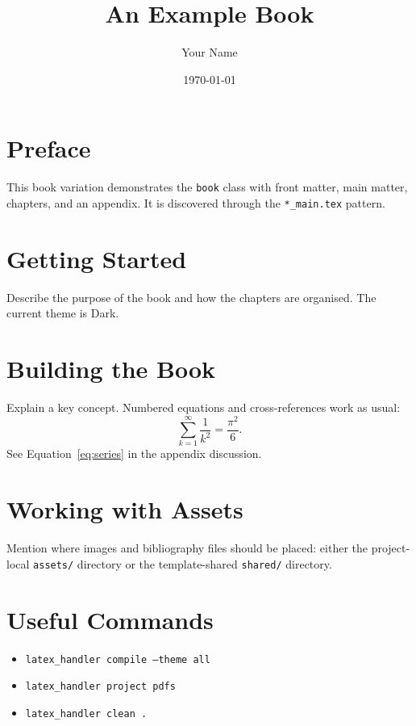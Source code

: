 \documentclass[11pt,a4paper]{book}
\title{An Example Book}
\author{Your Name}
\date{\today}
\def\lhthemevalue{Light}
\def\lhthemevalue{Dark}
\providecommand{\lhbar}{}
\providecommand{\lhfootertext}{}
\begin{document}
\frontmatter
\maketitle
\lhbar

\chapter*{Preface}
This book variation demonstrates the \texttt{book} class with front matter,
main matter, chapters, and an appendix. It is discovered through the
\texttt{*\_main.tex} pattern.

\tableofcontents

\mainmatter

\chapter{Getting Started}
Describe the purpose of the book and how the chapters are organised. The
current theme is \lhthemevalue.

\chapter{Building the Book}
Explain a key concept. Numbered equations and cross-references work as usual:
\begin{equation}
  \label{eq:series}
  \sum_{k=1}^{\infty} \frac{1}{k^2} = \frac{\pi^2}{6}.
\end{equation}
See Equation~\ref{eq:series} in the appendix discussion.

\chapter{Working with Assets}
Mention where images and bibliography files should be placed: either the
project-local \texttt{assets/} directory or the template-shared \texttt{shared/}
directory.

\appendix

\chapter{Useful Commands}
\begin{itemize}
  \item \texttt{latex\_handler compile --theme all}
  \item \texttt{latex\_handler project pdfs}
  \item \texttt{latex\_handler clean .}
\end{itemize}

\lhbar
\noindent\small\lhfootertext
\end{document}
